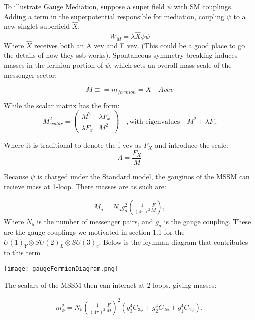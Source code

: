 To illustrate Gauge Mediation, suppose a super field $\psi$ with SM couplings. Adding a term in the superpotential responsible for mediation, coupling $\psi$ to a new singlet superfield $\hat{X}$:
\begin{equation*}
    W_M = \lambda \hat{X}  \bar{\psi}\psi 
\end{equation*}
Where $\hat{X}$ receives both an A vev and F vev. (This could be a good place to go the details of how they ssb works). Spontaneous symmetry breaking induces masses in the fermion portion of $\psi$, which sets an overall mass scale of the messenger sector:

\begin{equation*}
    M \equiv = m_{fermion} = X \quad A vev
\end{equation*}

While the scalar matrix has the form:
\begin{equation*}
M_{scalar}^2 = 
\begin{pmatrix}
M^2 & \lambda F_x \\
\lambda F_x & M^2
\end{pmatrix}
\quad , \textrm{with eigenvalues} \quad M^2 \pm \lambda F_x
\end{equation*}


Where it is traditional to denote the f vev as $F_X$ and introduce the scale:
\begin{equation*}
    \Lambda = \frac{F_X}{M}
\end{equation*}

Because $\psi$ is charged under the Standard model, the gauginos of the MSSM can recieve mass at 1-loop. There masses are as such are:

\begin{eqnarray}
M_{a}=N_5 g_a^2 \left ( \frac{1}{(4\pi)^2} \frac{F}{M} \right ),
\label{MGMgauginos}
\end{eqnarray}
Where $N_5$ is the number of messenger pairs, and $g_a$ is the gauge coupling. These are the gauge couplings we motivated in section 1.1 for the $U(1)_Y \otimes SU(2)_L \otimes SU(3)_c$. Below is the feynman diagram that contributes to this term
\begin{center}
    \texttt{[image: gaugeFermionDiagram.png]}
\end{center}

The scalars of the MSSM then can interact at 2-loops, giving masses: 

\begin{eqnarray}
m^2_{\phi} = N_5  \left ( \frac{1}{(4\pi)^2}\frac{F}{M} \right )^2 \left ( g_3^4 C_{3\phi}+g_2^4 C_{2\phi} + g_1^4 C_{1\phi} \right ),
\label{MGMscalars}
\end{eqnarray}

